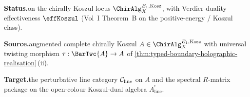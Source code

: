 \begin{theorem}%
\label{thm:line-operators-koszul-dual-modules-spectral-R}%
%
%
%

\noindent\textbf{Status.}\enspace \ClaimStatusProvedHere on the
chirally Koszul locus $\ChirAlg_{X}^{E_{1},\mathrm{Kosz}}$, with
Verdier-duality effectiveness $\effKoszul$ (Vol~I Theorem~B on the
positive-energy / Koszul class).

\noindent\textbf{Source.}\enspace augmented complete chirally Koszul
$A \in \ChirAlg_{X}^{E_{1},\mathrm{Kosz}}$ with universal twisting
morphism
$\tau : \BarTwc{A} \to A$ of
\cref{thm:typed-boundary-holographic-realisation}\,(ii).

\noindent\textbf{Target.}\enspace the perturbative line category
$\mathcal C_{\mathrm{line}}$ on $A$ and the spectral $R$-matrix package on
the open-colour Koszul-dual algebra $A^{!}_{\mathrm{line}}$.


\end{theorem}
